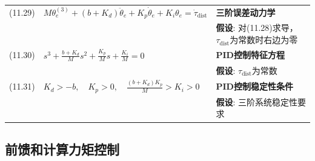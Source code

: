 \documentclass[12pt,a4paper]{article}
\begin{document}
\begin{longtable}{|p{}|p{}|p{}|}
(11.29) & $M\theta_e^{(3)} + (b + K_d)\ddot{\theta}_e + K_p\dot{\theta}_e + K_i\theta_e = \dot{\tau}_{\text{dist}}$ & 
\textbf{三阶误差动力学} \\
& & \textbf{假设}: 对(11.28)求导，$\tau_{\text{dist}}$为常数时右边为零 \\
\hline

(11.30) & $s^3 + \frac{b + K_d}{M}s^2 + \frac{K_p}{M}s + \frac{K_i}{M} = 0$ & 
\textbf{PID控制特征方程} \\
& & \textbf{假设}: $\tau_{\text{dist}}$为常数 \\
\hline

(11.31) & $K_d > -b, \quad K_p > 0, \quad \frac{(b + K_d)K_p}{M} > K_i > 0$ & 
\textbf{PID控制稳定性条件} \\
& & \textbf{假设}: 三阶系统稳定性要求 \\
\hline

\end{longtable}

\subsection{前馈和计算力矩控制}
\end{document}
